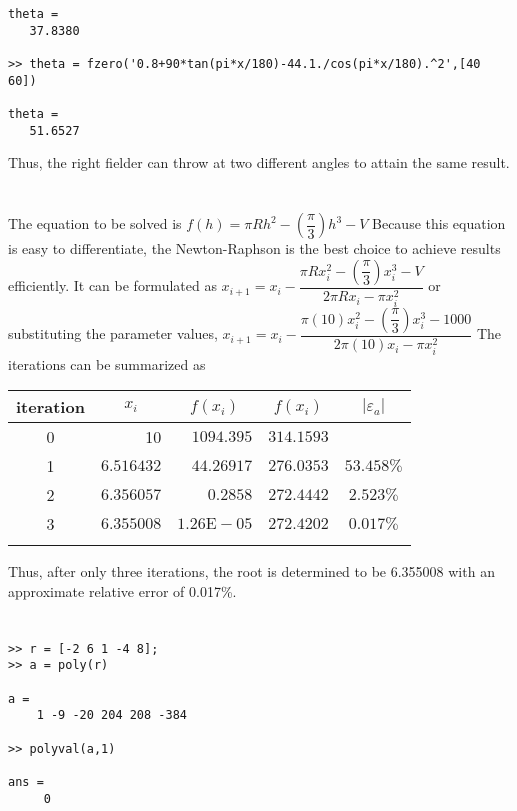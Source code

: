 \documentclass[../main.tex]{subfiles}
\begin{document}
\begin{enumerate}[label=\bfseries(\alph*)]
\begin{lstlisting}[numbers=none]
theta =
   37.8380
 
>> theta = fzero('0.8+90*tan(pi*x/180)-44.1./cos(pi*x/180).^2',[40 60])

theta =
   51.6527
\end{lstlisting}
Thus, the right fielder can throw at two different angles to attain the same result.
\bigbreak


\section{}
The equation to be solved is
\bigbreak
$f(h)=\pi R h^{2}-\left(\dfrac{\pi}{3}\right) h^{3}-V$
\bigbreak
Because this equation is easy to differentiate, the Newton-Raphson is the best choice to achieve results efficiently. It can be formulated as
\bigbreak
$x_{i+1}=x_{i}-\dfrac{\pi R x_{i}^{2}-\left(\dfrac{\pi}{3}\right) x_{i}^{3}-V}{2 \pi R x_{i}-\pi x_{i}^{2}}$
\bigbreak
or substituting the parameter values,
\bigbreak
$x_{i+1}=x_{i}-\dfrac{\pi(10) x_{i}^{2}-\left(\dfrac{\pi}{3}\right) x_{i}^{3}-1000}{2 \pi(10) x_{i}-\pi x_{i}^{2}}$
\bigbreak
The iterations can be summarized as
\bigbreak
\begin{tabular}{crrrc}
\Xhline{1.5pt}
iteration & \multicolumn{1}{c}{$x_{i}$} & \multicolumn{1}{c}{$f\left(x_{i}\right)$} & \multicolumn{1}{c}{$f\left(x_{i}\right)$} & \multicolumn{1}{c}{$\left|\varepsilon_{a}\right|$} \\
\hline
0 & 10 & $1094.395$ & $314.1593$ &  \\
1 & $6.516432$ & $44.26917$ & $276.0353$ & $53.458 \%$ \\
2 & $6.356057$ & $0.2858$ & $272.4442$ & $2.523 \%$ \\
3 & $6.355008$ & $1.26 \mathrm{E}-05$ & $272.4202$ & $0.017 \%$ \\
\Xhline{1.5pt}
\end{tabular}
\bigbreak
Thus, after only three iterations, the root is determined to be 6.355008 with an approximate
relative error of 0.017\%.
\bigbreak


\section{}
\begin{lstlisting}[numbers=none]
>> r = [-2 6 1 -4 8];
>> a = poly(r)

a =
    1 -9 -20 204 208 -384
    
>> polyval(a,1)

ans =
     0
 

\end{lstlisting}
\end{enumerate}
\end{document}
